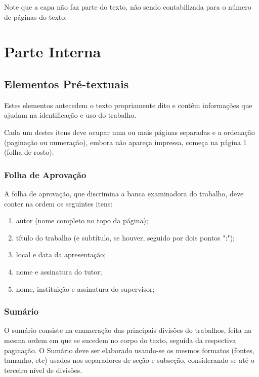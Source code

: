 \documentclass[repeatfields,xlists,xpacks,oneside,yearsonly]{ufrgscca}
\begin{document}
    Note que a capa não faz parte do texto, não sendo contabilizada para o número de páginas do texto.

    \section{Parte Interna}

    \subsection{Elementos Pré-textuais}

    Estes elementos antecedem o texto propriamente dito e contêm informações que
    ajudam na identificação e uso do trabalho.

    Cada um destes itens deve ocupar uma ou mais páginas separadas e a ordenação
    (paginação ou numeração), embora não apareça impressa, começa na página 1
    (folha de rosto).

    \subsubsection{Folha de Aprovação}

    A folha de aprovação, que discrimina a banca examinadora do trabalho, deve
    conter na ordem os seguintes itens:

    \begin{enumerate}
        \item autor (nome completo no topo da página);
        \item título do trabalho (e subtítulo, se houver, seguido por dois pontos ":");
        \item local e data da apresentação;
        \item nome e assinatura do tutor;
        \item nome, instituição e assinatura do supervisor;
    \end{enumerate}


    \subsubsection{Sumário}

    O sumário consiste na enumeração das principais divisões do trabalhos, feita
    na mesma ordem em que se sucedem no corpo do texto, seguida da respectiva
    paginação. O Sumário deve ser elaborado usando-se os mesmos formatos
    (fontes, tamanho, etc) usados nos separadores de seção e subseção,
    considerando-se até o terceiro nível de divisões.
\end{document}
